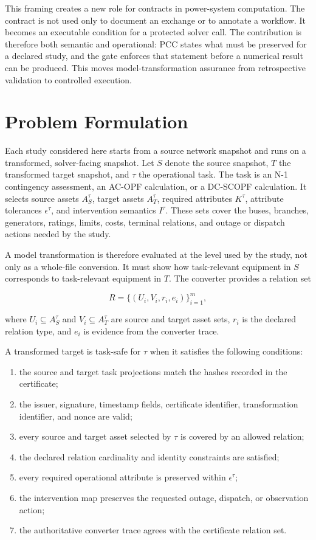 \documentclass[preprint,12pt]{elsarticle}
\begin{document}
This framing creates a new role for contracts in power-system computation. The contract is not used only to document an exchange or to annotate a workflow. It becomes an executable condition for a protected solver call. The contribution is therefore both semantic and operational: PCC states what must be preserved for a declared study, and the gate enforces that statement before a numerical result can be produced. This moves model-transformation assurance from retrospective validation to controlled execution.

\section{Problem Formulation}

Each study considered here starts from a source network snapshot and runs on a transformed, solver-facing snapshot. Let $S$ denote the source snapshot, $T$ the transformed target snapshot, and $\tau$ the operational task. The task is an N-1 contingency assessment, an AC-OPF calculation, or a DC-SCOPF calculation. It selects source assets $A_S^\tau$, target assets $A_T^\tau$, required attributes $K^\tau$, attribute tolerances $\epsilon^\tau$, and intervention semantics $I^\tau$. These sets cover the buses, branches, generators, ratings, limits, costs, terminal relations, and outage or dispatch actions needed by the study.

A model transformation is therefore evaluated at the level used by the study, not only as a whole-file conversion. It must show how task-relevant equipment in $S$ corresponds to task-relevant equipment in $T$. The converter provides a relation set

\[
R = \{(U_i, V_i, r_i, e_i)\}_{i=1}^{m},
\]

where $U_i \subseteq A_S^\tau$ and $V_i \subseteq A_T^\tau$ are source and target asset sets, $r_i$ is the declared relation type, and $e_i$ is evidence from the converter trace.

A transformed target is task-safe for $\tau$ when it satisfies the following conditions:

\begin{enumerate}
\item the source and target task projections match the hashes recorded in the certificate;
\item the issuer, signature, timestamp fields, certificate identifier, transformation identifier, and nonce are valid;
\item every source and target asset selected by $\tau$ is covered by an allowed relation;
\item the declared relation cardinality and identity constraints are satisfied;
\item every required operational attribute is preserved within $\epsilon^\tau$;
\item the intervention map preserves the requested outage, dispatch, or observation action;
\item the authoritative converter trace agrees with the certificate relation set.
\end{enumerate}
\end{document}
